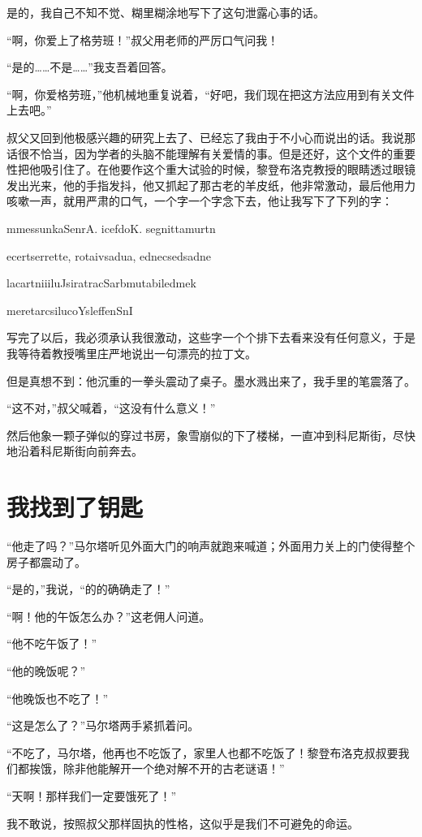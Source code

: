 \documentclass[10pt]{book}
\begin{document}
是的，我自己不知不觉、糊里糊涂地写下了这句泄露心事的话。

“啊，你爱上了格劳班！”叔父用老师的严厉口气问我！

“是的……不是……”我支吾着回答。

“啊，你爱格劳班，”他机械地重复说着，“好吧，我们现在把这方法应用到有关文件上去吧。”

叔父又回到他极感兴趣的研究上去了、已经忘了我由于不小心而说出的话。我说那话很不恰当，因为学者的头脑不能理解有关爱情的事。但是还好，这个文件的重要性把他吸引住了。在他要作这个重大试验的时候，黎登布洛克教授的眼睛透过眼镜发出光来，他的手指发抖，他又抓起了那古老的羊皮纸，他非常激动，最后他用力咳嗽一声，就用严肃的口气，一个字一个字念下去，他让我写下了下列的字：

mmessunkaSenrA. icefdoK. segnittamurtn

ecertserrette, rotaivsadua, ednecsedsadne

lacartniiiluJsiratracSarbmutabiledmek

meretarcsilucoYsleffenSnI

写完了以后，我必须承认我很激动，这些字一个个排下去看来没有任何意义，于是我等待着教授嘴里庄严地说出一句漂亮的拉丁文。

但是真想不到：他沉重的一拳头震动了桌子。墨水溅出来了，我手里的笔震落了。

“这不对，”叔父喊着，“这没有什么意义！”

然后他象一颗子弹似的穿过书房，象雪崩似的下了楼梯，一直冲到科尼斯街，尽快地沿着科尼斯街向前奔去。

\chapter{我找到了钥匙}
“他走了吗？”马尔塔听见外面大门的响声就跑来喊道；外面用力关上的门使得整个房子都震动了。

“是的，”我说，“的的确确走了！”

“啊！他的午饭怎么办？”这老佣人问道。

“他不吃午饭了！”

“他的晚饭呢？”

“他晚饭也不吃了！”

“这是怎么了？”马尔塔两手紧抓着问。

“不吃了，马尔塔，他再也不吃饭了，家里人也都不吃饭了！黎登布洛克叔叔要我们都挨饿，除非他能解开一个绝对解不开的古老谜语！”

“天啊！那样我们一定要饿死了！”

我不敢说，按照叔父那样固执的性格，这似乎是我们不可避免的命运。
\end{document}
